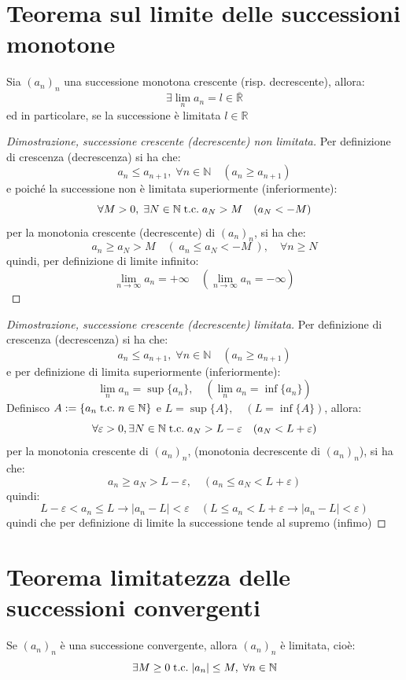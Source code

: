 \documentclass[a4paper,12pt,openright]{book}
\begin{document}
	\newpage
	
	\section{Teorema sul limite delle successioni monotone}
	Sia $(a_n)_n$ una successione monotona crescente (risp. decrescente), allora:
	\[\exists \lim_{n} a_n = l \in \overline{\mathbb{R}}\]
	ed in particolare, se la successione è limitata $l \in \mathbb{R}$
	
	\begin{proof}[Dimostrazione, successione crescente (decrescente) non limitata]
		Per definizione di crescenza (decrescenza) si ha che:
		\[a_n \leq a_{n + 1}, \; \forall n \in \mathbb{N} \quad (a_n \geq a_{n + 1})\]
		e poiché la successione non è limitata superiormente (inferiormente):
		\[\forall M > 0, \; \exists N \in \mathbb{N} \;\text{t.c.}\; a_N > M \quad (a_N < -M)\]
		per la monotonia crescente (decrescente) di $(a_n)_n$, si ha che:
		\[a_n \ge a_N > M \quad (\; a_n \le a_N < -M\;), \quad \forall n \ge N\]
		quindi, per definizione di limite infinito:
		\[\lim_{n \to \infty} a_n = +\infty \quad (\lim_{n \to \infty} a_n = -\infty)\]
	\end{proof}
	
	\begin{proof}[Dimostrazione, successione crescente (decrescente) limitata]
	Per definizione di crescenza (decrescenza) si ha che:
	\[a_n \leq a_{n + 1}, \; \forall n \in \mathbb{N} \quad (a_n \geq a_{n + 1} )\]
	e per definizione di limita superiormente (inferiormente):
	\[\lim_{n} a_n = \sup\{a_n\}, \quad (\lim_{n} a_n = \inf\{a_n\})\]
	Definisco $A := \{a_n \;\text{t.c.}\; n \in \mathbb{N}\}$ e $L = \sup\{A\}, \quad (L = \inf\{A\})$, allora:
	\[\forall \varepsilon > 0, \exists N \in \mathbb{N} \;\text{t.c.}\; a_N > L - \varepsilon \quad (a_N < L + \varepsilon)\]
	per la monotonia crescente di $(a_n)_n$, (monotonia decrescente di $(a_n)_n$), si ha che:
	\[a_n \geq a_N > L - \varepsilon, \quad (a_n \leq a_N < L + \varepsilon)\]
	quindi:
	\[L - \varepsilon < a_n \leq L \rightarrow |a_n - L| < \varepsilon \quad (L \leq a_n < L + \varepsilon \rightarrow |a_n - L| < \varepsilon)\]
	quindi che per definizione di limite la successione tende al supremo (infimo)
	\end{proof}
	
	\section{Teorema limitatezza delle successioni convergenti}
	Se $(a_n)_n$ è una successione convergente, allora $(a_n)_n$ è limitata, cioè:
	\[\exists M \geq 0 \;\text{t.c.}\; |a_n| \leq M, \; \forall n \in \mathbb{N}\]
	
\end{document}
